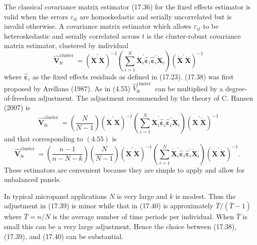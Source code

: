 \documentclass[10pt]{article}
\begin{document}
The classical covariance matrix estimator (17.36) for the fixed effects estimator is valid when the errors $\varepsilon_{i t}$ are homoskedastic and serially uncorrelated but is invalid otherwise. A covariance matrix estimator which allows $\varepsilon_{i t}$ to be heteroskedastic and serially correlated across $t$ is the cluster-robust covariance matrix estimator, clustered by individual
$$
\widehat{\boldsymbol{V}}_{\mathrm{fe}}^{\text {cluster }}=\left(\dot{\boldsymbol{X}}^{\prime} \dot{\boldsymbol{X}}\right)^{-1}\left(\sum_{i=1}^{N} \dot{\boldsymbol{X}}_{i}^{\prime} \widehat{\boldsymbol{\varepsilon}}_{i} \widehat{\boldsymbol{\varepsilon}}_{i}^{\prime} \dot{\boldsymbol{X}}_{i}\right)\left(\dot{\boldsymbol{X}}^{\prime} \dot{\boldsymbol{X}}\right)^{-1}
$$
where $\widehat{\boldsymbol{\varepsilon}}_{i}$ as the fixed effects residuals as defined in (17.23). (17.38) was first proposed by Arellano (1987). As in (4.55) $\widehat{V}_{\text {fe }}^{\text {cluster }}$ can be multiplied by a degree-of-freedom adjustment. The adjustment recommended by the theory of C. Hansen (2007) is
$$
\widehat{\boldsymbol{V}}_{\mathrm{fe}}^{\text {cluster }}=\left(\frac{N}{N-1}\right)\left(\dot{\boldsymbol{X}}^{\prime} \dot{\boldsymbol{X}}\right)^{-1}\left(\sum_{i=1}^{N} \dot{\boldsymbol{X}}_{i}^{\prime} \widehat{\boldsymbol{\varepsilon}}_{i} \widehat{\boldsymbol{\varepsilon}}_{i}^{\prime} \dot{\boldsymbol{X}}_{i}\right)\left(\dot{\boldsymbol{X}}^{\prime} \dot{\boldsymbol{X}}\right)^{-1}
$$
and that corresponding to $(4.55)$ is
$$
\widehat{\boldsymbol{V}}_{\mathrm{fe}}^{\text {cluster }}=\left(\frac{n-1}{n-N-k}\right)\left(\frac{N}{N-1}\right)\left(\dot{\boldsymbol{X}}^{\prime} \dot{\boldsymbol{X}}\right)^{-1}\left(\sum_{i=1}^{N} \dot{\boldsymbol{X}}_{i}^{\prime} \widehat{\boldsymbol{\varepsilon}}_{i} \widehat{\boldsymbol{\varepsilon}}_{i}^{\prime} \dot{\boldsymbol{X}}_{i}\right)\left(\dot{\boldsymbol{X}}^{\prime} \dot{\boldsymbol{X}}\right)^{-1} \text {. }
$$
These estimators are convenient because they are simple to apply and allow for unbalanced panels.

In typical micropanel applications $N$ is very large and $k$ is modest. Thus the adjustment in (17.39) is minor while that in (17.40) is approximately $\bar{T} /(\bar{T}-1)$ where $\bar{T}=n / N$ is the average number of time periods per individual. When $\bar{T}$ is small this can be a very large adjustment. Hence the choice between (17.38), (17.39), and (17.40) can be substantial.
\end{document}
